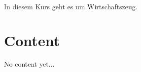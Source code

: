 \documentclass[../main.tex]{subfiles}
\begin{document}
    In diesem Kurs geht es um Wirtschaftszeug.
    \clearpage

    \section{Content}
        No content yet...
\end{document}
